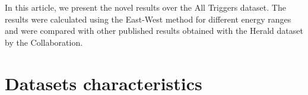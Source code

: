 \documentclass[12pt, doublespace, oneside]{article}
\begin{document}



In this article, we present the novel results over the All Triggers dataset. The results were calculated using the East-West method for different energy ranges and were compared with other published results obtained with the Herald dataset by the Collaboration.

\section{Datasets characteristics}

\end{document}
